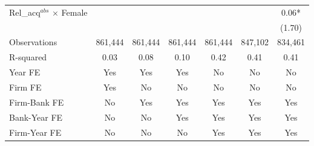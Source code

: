 {\begin{tabular*}{\hsize}{@{\hskip\tabcolsep\extracolsep\fill}l*{6}{c}}
Rel\_acq\(^{abs}\) $\times$ Female&            &            &            &            &            &     0.06*  \\
                &            &            &            &            &            &   (1.70)   \\
\midrule
Observations    &  861,444   &  861,444   &  861,444   &  861,444   &  847,102   &  834,461   \\
R-squared       &     0.03   &     0.08   &     0.10   &     0.42   &     0.41   &     0.41   \\
\midrule Year FE &      Yes   &      Yes   &      Yes   &       No   &       No   &       No   \\
Firm FE         &      Yes   &       No   &       No   &       No   &       No   &       No   \\
Firm-Bank FE    &       No   &      Yes   &      Yes   &      Yes   &      Yes   &      Yes   \\
Bank-Year FE    &       No   &       No   &      Yes   &      Yes   &      Yes   &      Yes   \\
Firm-Year FE    &       No   &       No   &       No   &      Yes   &      Yes   &      Yes   \\
\bottomrule
\end{tabular*}
}
